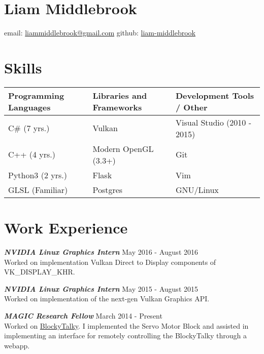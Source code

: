 \documentclass[line,margin]{res}
\begin{document}
\marginsize{.5in}{.5in}{.5in}{.5in}

\section{Liam Middlebrook}

\hfill email: \href{mailto:liammiddlebrook@gmail.com}{liammiddlebrook@gmail.com}
github: \href{https://github.com/liam-middlebrook}{liam-middlebrook}

\begin{resume}


\section{Skills}
\begin{table}[h]
\begin{tabular}{@{}lll@{}}
\toprule
Programming Languages & Libraries and Frameworks & Development Tools / Other   \\ \midrule
C\# (7 yrs.)          & Vulkan                   & Visual Studio (2010 - 2015) \\
C++ (4 yrs.)          & Modern OpenGL (3.3+)     & Git                         \\
Python3 (2 yrs.)      & Flask                    & Vim                         \\
GLSL (Familiar)       & Postgres                 & GNU/Linux                   \\ \bottomrule

\end{tabular}
\end{table}


\section{Work Experience}

{\textbf{\emph{NVIDIA Linux Graphics Intern}}} \hfill May 2016 - August 2016\\
Worked on implementation Vulkan Direct to Display components of VK\_DISPLAY\_KHR.

{\textbf{\emph{NVIDIA Linux Graphics Intern}}} \hfill May 2015 - August 2015\\
Worked on implementation of the next-gen Vulkan Graphics API.

{\textbf{\emph{MAGIC Research Fellow}}} \hfill March 2014 - Present\\
Worked on \href{https://github.com/liam-middlebrook/blockytalky.git}{BlockyTalky}. I implemented
the Servo Motor Block and assisted in implementing an interface for remotely controlling the
BlockyTalky through a webapp.


\end{resume}
\end{document}
